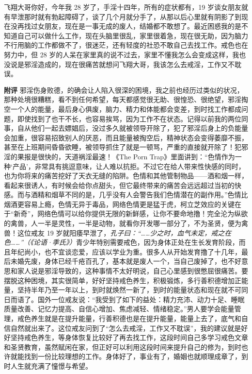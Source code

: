 \begin{case}
    飞翔大哥你好，今年我 28 岁了，手淫十四年，所有的症状都有，19 岁谈女朋友就有早泄那时就有勃起障碍了，谈了几个月就分手了，从那以后心里就有阴影了到现在没再找过女朋友，现在是一事无成的废人，结婚都不敢想了。最近困惑我的是不知道自己可以做什么工作，现在头脑里很乱，家里很着急，现在很无助，因为脑力不行用脑的工作都做不了，很迷茫，还有轻度的社恐不敢自己去找工作。戒色也在努力中，但 28 岁的人呆在家里真的说不过去，家里不懂我怎么会变成这样，我也没说是邪淫造成的，现在很痛苦就想问飞翔大哥，我该怎么去戒淫，工作又不耽误。

    \textbf{附评} 邪淫伤身败德，的确会让人陷入很深的困境，我之前也经历过类似的状况，那种处境很糟糕，看不到任何希望，每天都感觉很无助、很惶恐、很绝望，邪淫掏空一个人的能量，最后身心俱废，脑力、精力和体能都会变差，到时找工作都成问题，即使找到了也干不长，也容易挨骂，因为工作不在状态。记得以前我的两位同事，自从他们一起去嫖娼后，没过多久就被领导开除了，犯了邪淫后身上的负能量会加重，很容易招致别人的厌恶，而且能量被掏空后，精神状态会变得萎靡不振，甚至在上班期间昏昏欲睡，被领导抓住了就是一顿骂，严重的直接就开除了！犯邪淫的果报是很快的，天道祸淫最速！《The Porn Trap》里面讲到：“色情作为一种‘产品’，非常具有挑逗意味，让人难以抗拒。不过它在给人带来性快感的同时，也为你将来的痛苦挖好了天衣无缝的陷阱。色情和其他管制物品——酒和烟一样，看起来很诱人，有时候会给你点甜头，但它最终带来的痛苦会远远超过当初的快感。而与酒精和烟草不同的是，几乎没有人会警告我们色情潜在的副作用。”色情比烟酒更容易上瘾，色情无异于毒品，网络色情更是猛于虎，柯立芝效应的关键在于“新奇”，网络色情可以给你提供无限的新鲜感，让你不要命地撸！完全沦为纵欲的禽兽，人一半是灵性，一半是动物，就看你开发哪一部分了，不为圣贤，便为禽兽！这位戒友 19 岁就阳痿早泄了，\textit{孔子曰：“……少之时，血气未定，戒之在色……”（《论语·季氏》）}青少年特别需要戒色，因为身体正处在生长发育阶段，而且年纪尚小，也不宜谈恋爱，应该以学业为重。很多人从开始发育撸了十几年，最后未婚先废，身体已经千疮百孔了，基本就是废人一个，当自己废掉了，也不好意思和家人说是邪淫导致的，这种事情不太好明说，自己心里感到很憋屈很痛苦。要摆脱这种困境，其实很简单，好好坚持戒色养生，积极锻炼，多行善积德增加正能量，坚持半年乃至一年以上，到时就焕然一新了，到时的能量状态和现在就不可同日而语了。国外一位戒友说：“我受到了如下的益处：精力充沛、动力十足、睡眠质量改善、记忆力提高、自信心增加、焦虑减轻、情绪稳定。”男人要学会能量管理，戒色养生就是在提升能量，行善积德也是在提升能量，能量上去了，底气和自信自然就出来了。这位戒友问到了“怎么去戒淫，工作又不耽误”，我的建议就是好好坚持戒色养生，等身体恢复比较好了再去找工作，这段时间自己多学习戒色文章和圣贤教育，虽然赋闲在家，但正好可以利用这段时间来提升自己的修为，到时也许就能找到一份比较理想的工作。身体好了，事业有了，婚姻也就顺理成章了，到时人生就充满了憧憬与希望。
\end{case}

